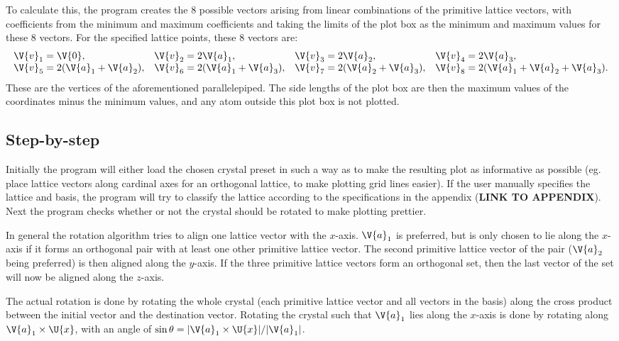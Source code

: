 \documentclass[main.tex]{subfiles}
\begin{document}
	To calculate this, the program creates the 8 possible vectors arising from linear combinations of the primitive lattice vectors, with coefficients from the minimum and maximum coefficients and taking the limits of the plot box as the minimum and maximum values for these 8 vectors. For the specified lattice points, these 8 vectors are:
	\begin{equation}
		\begin{array}{llll}
			\V{v}_1 = \V{0}, & \V{v}_2 = 2\V{a}_1, & \V{v}_3 = 2\V{a}_2, & \V{v}_4 = 2\V{a}_3, \\
			\V{v}_5 = 2(\V{a}_1+\V{a}_2), & \V{v}_6 = 2(\V{a}_1+\V{a}_3), & \V{v}_7 = 2(\V{a}_2+\V{a}_3), &\V{v}_8 = 2(\V{a}_1+\V{a}_2+ \V{a}_3).
		\end{array}
	\end{equation}
	These are the vertices of the aforementioned parallelepiped. The side lengths of the plot box are then the maximum values of the coordinates minus the minimum values, and any atom outside this plot box is not plotted.  
	
	\subsection{Step-by-step}
	Initially the program will either load the chosen crystal preset in such a way as to make the resulting plot as informative as possible (eg. place lattice vectors along cardinal axes for an orthogonal lattice, to make plotting grid lines easier). If the user manually specifies the lattice and basis, the program will try to classify the lattice according to the specifications in the appendix (\textbf{LINK TO APPENDIX}). Next the program checks whether or not the crystal should be rotated to make plotting prettier.
	
	In general the rotation algorithm tries to align one lattice vector with the $ x $-axis. $ \V{a}_1 $ is preferred, but is only chosen to lie along the $ x $-axis if it forms an orthogonal pair with at least one other primitive lattice vector. The second primitive lattice vector of the pair ($\V{a}_2$ being preferred) is then aligned along the $ y $-axis. If the three primitive lattice vectors form an orthogonal set, then the last vector of the set will now be aligned along the $ z $-axis.
	
	The actual rotation is done by rotating the whole crystal (each primitive lattice vector and all vectors in the basis) along the cross product between the initial vector and the destination vector. Rotating the crystal such that $ \V{a}_1 $ lies along the $ x $-axis is done by rotating along $ \V{a}_1 \times \U{x} $, with an angle of $ \sin \theta = |\V{a}_1 \times \U{x}| / |\V{a}_1| $.
	
\end{document}
